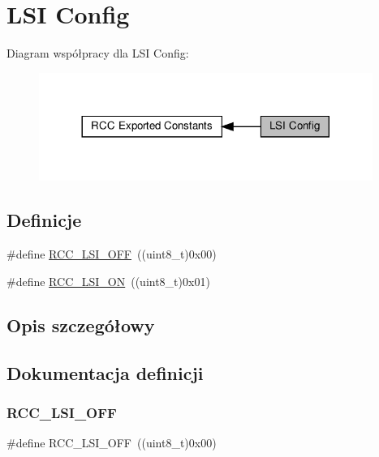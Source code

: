 \hypertarget{group___r_c_c___l_s_i___config}{}\section{L\+SI Config}
\label{group___r_c_c___l_s_i___config}
Diagram współpracy dla L\+SI Config\+:\nopagebreak
\begin{figure}[H]
\begin{center}
\leavevmode
\includegraphics[width=308pt]{group___r_c_c___l_s_i___config}
\end{center}
\end{figure}
\subsection*{Definicje}
\begin{DoxyCompactItemize}
\item 
\#define \hyperlink{group___r_c_c___l_s_i___config_gaa1710927d79a2032f87f039c4a27356a}{R\+C\+C\+\_\+\+L\+S\+I\+\_\+\+O\+FF}~((uint8\+\_\+t)0x00)
\item 
\#define \hyperlink{group___r_c_c___l_s_i___config_ga6b364ac3500e60b6bff695ee518c87d6}{R\+C\+C\+\_\+\+L\+S\+I\+\_\+\+ON}~((uint8\+\_\+t)0x01)
\end{DoxyCompactItemize}


\subsection{Opis szczegółowy}


\subsection{Dokumentacja definicji}
\mbox{\label{group___r_c_c___l_s_i___config_gaa1710927d79a2032f87f039c4a27356a}} 
\subsubsection{\texorpdfstring{R\+C\+C\+\_\+\+L\+S\+I\+\_\+\+O\+FF}{RCC\_LSI\_OFF}}
{\footnotesize\ttfamily \#define R\+C\+C\+\_\+\+L\+S\+I\+\_\+\+O\+FF~((uint8\+\_\+t)0x00)}



